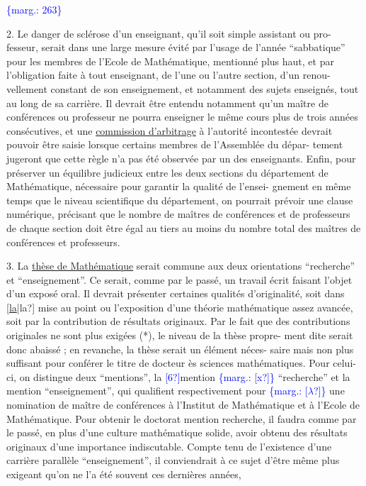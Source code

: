 \documentclass[11pt]{article}
\newcommand{\scanpage}[1]{\par\bigskip\noindent{\small\sffamily[scan #1]}\par}
\newcommand{\mspage}[1]{{\small\sffamily[p.\,#1]}}
\newcommand{\hand}[1]{\textcolor{blue}{#1}}
\newcommand{\margin}[1]{\textcolor{blue}{\{\textsf{marg.:} #1\}}}
\newcommand{\uline}[1]{\underline{#1}}
\newcommand{\unsure}[1]{[#1?]}
\begin{document}
\margin{263}

\clearpage
\scanpage{119/264}
\mspage{11}

2. Le danger de sclérose d'un enseignant, qu'il soit simple assistant ou pro-%
fesseur, serait dans une large mesure évité par l'usage de l'année ``sabbatique''
pour les membres de l'Ecole de Mathématique, mentionné plus haut, et par
l'obligation faite à tout enseignant, de l'une ou l'autre section, d'un renou-%
vellement constant de son enseignement, et notamment des sujets enseignés,
tout au long de sa carrière. Il devrait être entendu notamment qu'un maître
de conférences ou professeur ne pourra enseigner le même cours plus de trois
années consécutives, et une \uline{commission d'arbitrage} à l'autorité incontestée
devrait pouvoir être saisie lorsque certains membres de l'Assemblée du dépar-%
tement jugeront que cette règle n'a pas été observée par un des enseignants.
Enfin, pour préserver un équilibre judicieux entre les deux sections du
département de Mathématique, nécessaire pour garantir la qualité de l'ensei-%
gnement en même temps que le niveau scientifique du département, on pourrait
prévoir une clause numérique, précisant que le nombre de maîtres de conférences
et de professeurs de chaque section doit être égal au tiers au moins du nombre
total des maîtres de conférences et professeurs.

3. La \uline{thèse de Mathématique} serait commune aux deux orientations ``recherche''
et ``enseignement''. Ce serait, comme par le passé, un travail écrit faisant
l'objet d'un exposé oral. Il devrait présenter certaines qualités d'originalité,
soit dans \unsure{\uline{la}|la} mise au point ou l'exposition d'une théorie mathématique assez
avancée, soit par la contribution de résultats originaux. Par le fait que des
contributions originales ne sont plus exigées (*), le niveau de la thèse propre-%
ment dite serait donc abaissé ; en revanche, la thèse serait un élément néces-%
saire mais non plus suffisant pour conférer le titre de docteur ès sciences
mathématiques. Pour celui-ci, on distingue deux ``mentions'', la \hand{\unsure{6}}mention \margin{\unsure{x}}
``recherche'' et la mention ``enseignement'', qui qualifient respectivement pour \margin{\unsure{$\lambda$}}
une nomination de maître de conférences à l'Institut de Mathématique et à
l'Ecole de Mathématique. Pour obtenir le doctorat mention recherche, il
faudra comme par le passé, en plus d'une culture mathématique solide, avoir
obtenu des résultats originaux d'une importance indiscutable. Compte tenu de
l'existence d'une carrière parallèle ``enseignement'', il conviendrait à ce
sujet d'être même plus exigeant qu'on ne l'a été souvent ces dernières années,
\end{document}
